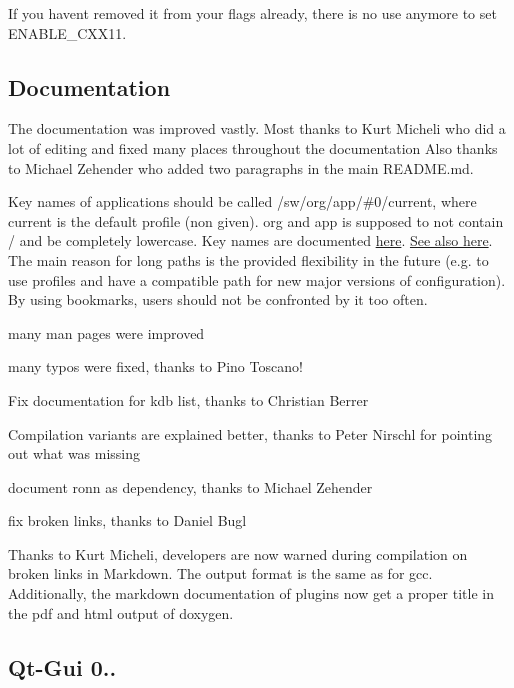 If you haven\textquotesingle{}t removed it from your flags already, there is no use anymore to set {\ttfamily E\+N\+A\+B\+L\+E\+\_\+\+C\+X\+X11}.

\subsection*{Documentation}

The documentation was improved vastly. Most thanks to Kurt Micheli who did a lot of editing and fixed many places throughout the documentation Also thanks to Michael Zehender who added two paragraphs in the main R\+E\+A\+D\+M\+E.\+md.

Key names of applications should be called {\ttfamily /sw/org/app/\#0/current}, where {\ttfamily current} is the default profile (non given). {\ttfamily org} and {\ttfamily app} is supposed to not contain {\ttfamily /} and be completely lowercase. Key names are documented \hyperlink{md_doc_help_elektra-key-names_doc_help_elektra-key-names_md}{here}. \hyperlink{doc_tutorials_application-integration_md}{See also here}. The main reason for long paths is the provided flexibility in the future (e.\+g. to use profiles and have a compatible path for new major versions of configuration). By using bookmarks, users should not be confronted by it too often.


\begin{DoxyItemize}
\item many man pages were improved
\item many typos were fixed, thanks to Pino Toscano!
\item Fix documentation for kdb list, thanks to Christian Berrer
\item Compilation variants are explained better, thanks to Peter Nirschl for pointing out what was missing
\item document ronn as dependency, thanks to Michael Zehender
\item fix broken links, thanks to Daniel Bugl
\end{DoxyItemize}

Thanks to Kurt Micheli, developers are now warned during compilation on broken links in Markdown. The output format is the same as for gcc. Additionally, the markdown documentation of plugins now get a proper title in the pdf and html output of doxygen.

\subsection*{Qt-\/\+Gui 0..}

